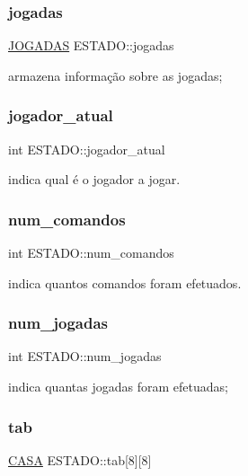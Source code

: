 \subsubsection{\texorpdfstring{jogadas}{jogadas}}
{\footnotesize\ttfamily \hyperlink{dados_8h_a94c221d29a1760f008b7834093259b7d}{J\+O\+G\+A\+D\+AS} E\+S\+T\+A\+D\+O\+::jogadas}

armazena informação sobre as jogadas; \mbox{\label{structESTADO_a5dd28e2e68b7aef2b6b7ea88e02eff58}} 
\subsubsection{\texorpdfstring{jogador\+\_\+atual}{jogador\_atual}}
{\footnotesize\ttfamily int E\+S\+T\+A\+D\+O\+::jogador\+\_\+atual}

indica qual é o jogador a jogar. \mbox{\label{structESTADO_abe6faacdd6111160bf9a354f44b95b38}} 
\subsubsection{\texorpdfstring{num\+\_\+comandos}{num\_comandos}}
{\footnotesize\ttfamily int E\+S\+T\+A\+D\+O\+::num\+\_\+comandos}

indica quantos comandos foram efetuados. \mbox{\label{structESTADO_a261495728744647e618b4e623f5a4b7a}} 
\subsubsection{\texorpdfstring{num\+\_\+jogadas}{num\_jogadas}}
{\footnotesize\ttfamily int E\+S\+T\+A\+D\+O\+::num\+\_\+jogadas}

indica quantas jogadas foram efetuadas; \mbox{\label{structESTADO_ab56f0f1be16954d3768b4174d14c087d}} 
\subsubsection{\texorpdfstring{tab}{tab}}
{\footnotesize\ttfamily \hyperlink{dados_8h_aba91601f16d4c485b2d9b8c429f27039}{C\+A\+SA} E\+S\+T\+A\+D\+O\+::tab\mbox{[}8\mbox{]}\mbox{[}8\mbox{]}}

